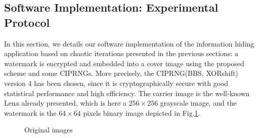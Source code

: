 \subsection{Software Implementation: Experimental Protocol}

In this section, we details our software implementation of the information hiding application
 based on chaotic iterations presented in the previous sections: a watermark is encrypted and embedded into a cover image using the proposed scheme and some CIPRNGs. More precisely,
the CIPRNG(BBS, XORshift) version 4 has been chosen, since it is cryptographically secure with good statistical performance and high efficiency.  The carrier image is the well-known Lena
already presented, which is here a $256 \times 256$ grayscale image, and the watermark is the $64\times 64$ pixels binary image depicted in Fig.\ref{Original images}.


\begin{figure}[!t]
\centering
{}
\hfil
{}
\caption{Original images}
\label{Original images}
\end{figure}


